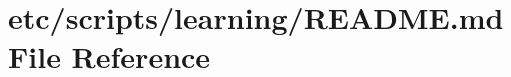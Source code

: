 \hypertarget{etc_2scripts_2learning_2README_8md}{}\section{etc/scripts/learning/\+R\+E\+A\+D\+ME.md File Reference}
\label{etc_2scripts_2learning_2README_8md}
